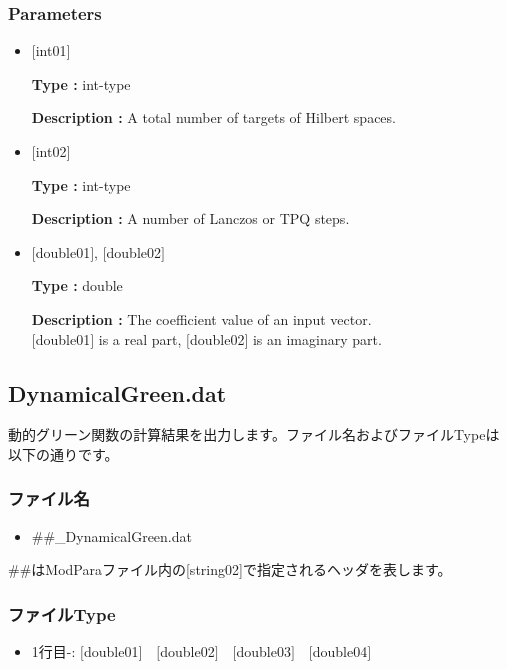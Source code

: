 \subsubsection{Parameters}
 \begin{itemize}

  \item  $[$int01$]$

 {\bf Type :} int-type

{\bf Description :}  A total number of targets of Hilbert spaces.

  \item  $[$int02$]$

 {\bf Type :} int-type

{\bf Description :}  { A number of Lanczos or TPQ steps.}

 \item  $[$double01$]$, $[$double02$]$

 {\bf Type :} double 

{\bf Description :} The coefficient value of an input vector.\\
$[$double01$]$ is a real part, $[$double02$]$ is an imaginary part.\\

\end{itemize}

\newpage
\subsection{{DynamicalGreen.dat}}
\label{Subsec:dynamicalG}
動的グリーン関数の計算結果を出力します。ファイル名およびファイルTypeは以下の通りです。

\subsubsection{ファイル名}
\begin{itemize}
   \item{\#\#\_DynamicalGreen.dat}
\end{itemize}
  \#\#はModParaファイル内の[string02]で指定されるヘッダを表します。
  
\subsubsection{ファイルType}
 \begin{itemize}
   \item  1行目-: $[$double01$]$~~$[$double02$]$~~$[$double03$]$~~$[$double04$]$
  \end{itemize}
